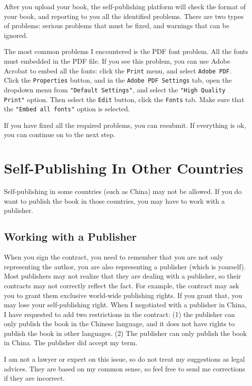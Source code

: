 After you upload your book, the self-publishing platform will check the format of your book,
and reporting to you all the identified problems. There are two types of problems: serious
problems that must be fixed, and warnings that can be ignored. 


The most common problems I encountered is the PDF font problem. All the fonts must embedded in
the PDF file. If you see this problem, you can use Adobe Acrobat to embed all the fonts: click
the \texttt{Print} menu, and select \texttt{Adobe PDF}. Click the \texttt{Properties} button,
and in the \texttt{Adobe PDF Settings} tab, open the dropdown menu from
\texttt{"Default Settings"}, and select the \texttt{"High Quality Print"} option.
Then select the \texttt{Edit} button, click the \texttt{Fonts} tab. Make sure that 
the \texttt{"Embed all fonts"} option is selected.  


If you have fixed all the required problems, you can resubmit. If everything is ok, you can
continue on to the next step. 




\section{Self-Publishing In Other Countries}

Self-publishing in some countries (such as China) may not be allowed.
If you do want to publish the book in those countries, you may have to 
work with a publisher. 


\subsection{Working with a Publisher}

When you sign
the contract, you need to remember that you are not only representing the author, 
you are also representing a
publisher (which is yourself). Most publishers may not realize that they 
are dealing with a publisher, so their contracts may not correctly reflect the fact. 
For example, the contract may ask you to grant them exclusive world-wide publishing rights. 
If you grant that, you may lose your self-publishing right.  
When I negotiated with a publisher in China, I have requested to add two restrictions in the 
contract: (1) the publisher can only publish the book in the Chinese language, 
and it does not have rights to publish the book in other languages. 
(2) The publisher can only publish the book in China. 
The publisher did accept my term. 


I am not a lawyer or expert on this issue, so do not treat my suggestions as 
legal advices. They are based on my common sense, so 
feel free to send me corrections if they are incorrect. 





